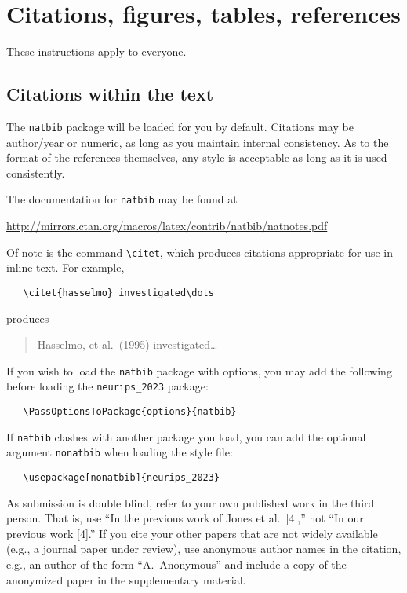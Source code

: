 \documentclass{article}
\begin{document}
\section{Citations, figures, tables, references}
\label{others}


These instructions apply to everyone.


\subsection{Citations within the text}


The \verb+natbib+ package will be loaded for you by default.  Citations may be
author/year or numeric, as long as you maintain internal consistency.  As to the
format of the references themselves, any style is acceptable as long as it is
used consistently.


The documentation for \verb+natbib+ may be found at
\begin{center}
    \url{http://mirrors.ctan.org/macros/latex/contrib/natbib/natnotes.pdf}
\end{center}
Of note is the command \verb+\citet+, which produces citations appropriate for
use in inline text.  For example,
\begin{verbatim}
   \citet{hasselmo} investigated\dots
\end{verbatim}
produces
\begin{quote}
    Hasselmo, et al.\ (1995) investigated\dots
\end{quote}


If you wish to load the \verb+natbib+ package with options, you may add the
following before loading the \verb+neurips_2023+ package:
\begin{verbatim}
   \PassOptionsToPackage{options}{natbib}
\end{verbatim}


If \verb+natbib+ clashes with another package you load, you can add the optional
argument \verb+nonatbib+ when loading the style file:
\begin{verbatim}
   \usepackage[nonatbib]{neurips_2023}
\end{verbatim}


As submission is double blind, refer to your own published work in the third
person. That is, use ``In the previous work of Jones et al.\ [4],'' not ``In our
previous work [4].'' If you cite your other papers that are not widely available
(e.g., a journal paper under review), use anonymous author names in the
citation, e.g., an author of the form ``A.\ Anonymous'' and include a copy of the anonymized paper in the supplementary material.
\end{document}
